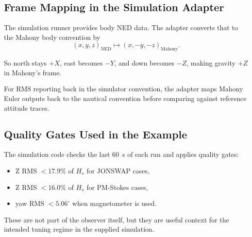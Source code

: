 \documentclass[conference]{IEEEtran}
\begin{document}
\subsection{Frame Mapping in the Simulation Adapter}

The simulation runner provides body NED data. The adapter converts that to the
Mahony body convention by
\begin{equation}
(x,y,z)_{\mathrm{NED}}
\mapsto
(x,-y,-z)_{\mathrm{Mahony}}.
\end{equation}

So north stays \(+X\), east becomes \(-Y\), and down becomes \(-Z\),
making gravity \(+Z\) in Mahony’s frame.

For RMS reporting back in the simulator convention, the adapter maps Mahony
Euler outputs back to the nautical convention before comparing against
reference attitude traces.

\subsection{Quality Gates Used in the Example}

The simulation code checks the last \SI{60}{s} of each run and applies quality
gates:
\begin{itemize}[leftmargin=1.4em]
  \item Z RMS \(< 17.9\%\) of \(H_s\) for JONSWAP cases,
  \item Z RMS \(< 16.0\%\) of \(H_s\) for PM-Stokes cases,
  \item yaw RMS \(< 5.06^\circ\) when magnetometer is used.
\end{itemize}

These are not part of the observer itself, but they are useful context for the
intended tuning regime in the supplied simulation.
\end{document}
